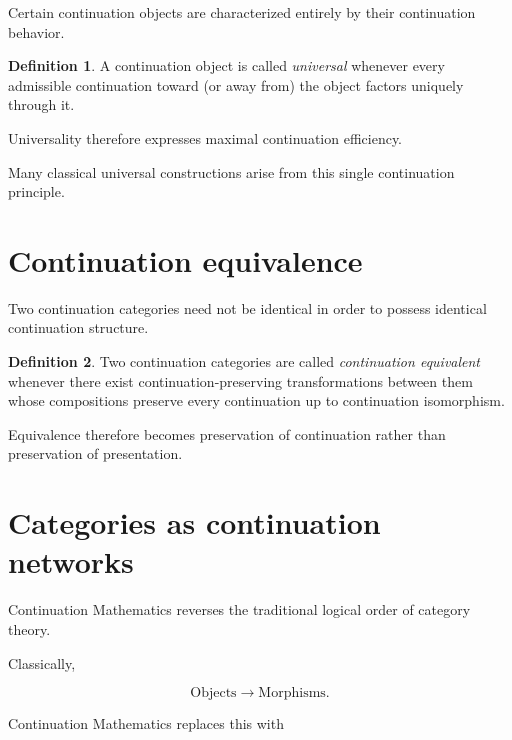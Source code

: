 \documentclass[13pt,openany]{book}
\theoremstyle{plain}
\theoremstyle{definition}
\newtheorem{definition}{Definition}[chapter]
\begin{document}
Certain continuation objects are characterized entirely by their continuation
behavior.

\begin{definition}

A continuation object is called
\emph{universal}
whenever every admissible continuation toward (or away from) the object factors
uniquely through it.

\end{definition}

Universality therefore expresses maximal continuation efficiency.

Many classical universal constructions arise from this single continuation
principle.

\section{Continuation equivalence}

Two continuation categories need not be identical in order to possess identical
continuation structure.

\begin{definition}

Two continuation categories are called
\emph{continuation equivalent}
whenever there exist continuation-preserving transformations between them whose
compositions preserve every continuation up to continuation isomorphism.

\end{definition}

Equivalence therefore becomes preservation of continuation rather than
preservation of presentation.

\section{Categories as continuation networks}

Continuation Mathematics reverses the traditional logical order of category
theory.

Classically,

\[
\text{Objects}
\longrightarrow
\text{Morphisms}.
\]

Continuation Mathematics replaces this with
\end{document}
